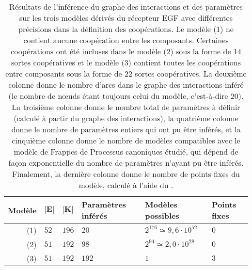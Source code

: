 \begin{table}[ht]
  \ZifferAn
  \begin{center}
  \begin{tabular}{r|l|l|l|l|l} %
    \textbf{Modèle} & $\mathbf{|E|}$ & $\mathbf{|K|}$ & \textbf{Paramètres inférés} &
      \textbf{Modèles possibles} & \textbf{Points fixes}
  \\\hline\hline
    (1) & $52$ & $196$ & $20$ & $2^{176}\simeq 9,6\cdot10^{52}$ & $0$   %
  \\\hline
    (2) & $51$ & $192$ & $98$ & $2^{94}\simeq 2,0\cdot10^{28}$ & $0$    %
  \\\hline
    (3) & $51$ & $192$ & $192$ & $1$ & $3$                              %
  \\\hline
  \end{tabular}
  \end{center}
  \caption{%
    Résultats de l'inférence du graphe des interactions et des paramètres
    sur les trois modèles dérivés du récepteur EGF %
    avec différentes précisions dans la définition des coopérations.
    Le modèle (1) ne contient aucune coopération entre les composants.
    Certaines coopérations ont été incluses dans le modèle (2) sous la forme de 14
    sortes coopératives et le modèle (3) contient toutes les coopérations entre composants
    sous la forme de 22 sortes coopératives.
    La deuxième colonne donne le nombre d'arcs dans le graphe des interactions inféré
    (le nombre de nœuds étant toujours celui du modèle, c'est-à-dire 20).
    La troisième colonne donne le nombre total de paramètres à définir
    (calculé à partir du graphe des interactions),
    la quatrième colonne donne le nombre de paramètres entiers qui ont pu être inférés,
    et la cinquième colonne donne le nombre de modèles compatibles avec le modèle
    de Frappes de Processus canoniques étudié,
    qui dépend de façon exponentielle du nombre de paramètres n'ayant pu être inférés.
    Finalement, la dernière colonne donne le nombre de points fixes du modèle,
    calculé à l'aide du .
  }
  \ZifferAus
\end{table}


